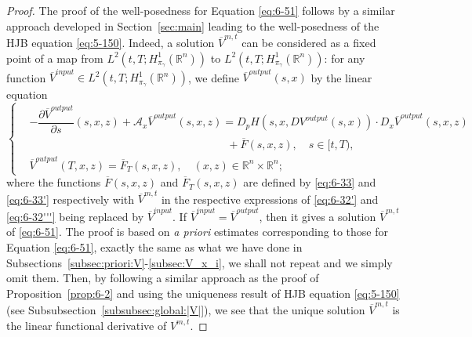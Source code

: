 \documentclass[11pt]{article}
\numberwithin{equation}{section}
\newcommand{\brn}{{\mathbb{R}^n}}
\newcommand{\1}{\mbox{1\hspace{-1mm}I}}
\begin{document}
\begin{proof}
The proof of the well-posedness for Equation \eqref{eq:6-51} follows by a similar approach developed in Section~\ref{sec:main} leading to the well-posedness of the HJB equation \eqref{eq:5-150}. Indeed, a solution $\overline{V}^{m,t}$ can be considered as a fixed point of a map from $L^{2}\left(t,T;H_{\pi_{\gamma}}^{1}(\brn)\right)$ to $L^{2}\left(t,T;H_{\pi_{\gamma}}^{1}(\brn)\right)$: for any function $\overline{V}^{input}\in L^{2}\left(t,T;H_{\pi_{\gamma}}^{1}(\brn)\right)$, we define $\overline{V}^{output}(s,x)$ by the linear equation 
\begin{equation*}
    \left\{
    \begin{aligned}
        &-\dfrac{\partial \overline{V}^{output}}{\partial s}(s,x,z)+\mathcal{A}_{x}\overline{V}^{output}(s,x,z)=D_{p}H\left(s,x,DV^{output}(s,x)\right)\cdot D_{x}\overline{V}^{output}(s,x,z)\\
        &\qquad\qquad\qquad\qquad\qquad\qquad\qquad\qquad\qquad +\overline{F}(s,x,z),\quad s\in[t,T),\\
        &\overline{V}^{output}(T,x,z)=\overline{F}_T(s,x,z),\quad (x,z)\in\brn\times\brn;
    \end{aligned}
    \right.
\end{equation*}
where the functions $\overline{F}(s,x,z)$ and $\overline{F}_T(s,x,z)$ are defined by \eqref{eq:6-33} and \eqref{eq:6-33'} respectively with $\overline{V}^{m,t}$ in the respective expressions of \eqref{eq:6-32'} and \eqref{eq:6-32'''} being replaced by $\overline{V}^{input}$. If $\overline{V}^{input}=\overline{V}^{output}$, then it gives a solution $\overline{V}^{m,t}$ of \eqref{eq:6-51}. The proof is based on \textit{a priori} estimates corresponding to those for Equation \eqref{eq:6-51}, exactly the same as what we have done in Subsections~\ref{subsec:priori:V}-\ref{subsec:V_x_i}, we shall not repeat and we simply omit them. Then, by following a similar approach as the proof of Proposition~\ref{prop:6-2} and using the uniqueness result of HJB equation \eqref{eq:5-150} (see Subsubsection~\ref{subsubsec:global:|V|}), we see that the unique solution $\overline{V}^{m,t}$ is the linear functional derivative of $V^{m,t}$. 
\end{proof}
\end{document}
